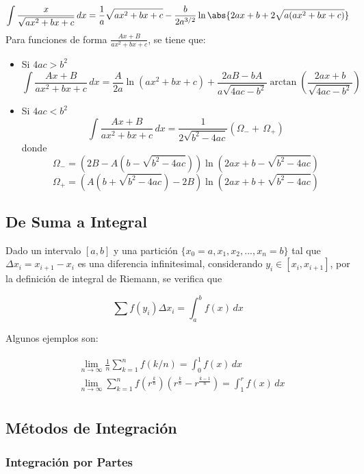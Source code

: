 \[\int\frac{x}{\sqrt{ax^2 + bx +c}}\,dx = \frac{1}{a}\sqrt{ax^2 +bx +c} - \frac{b}{2a^{3/2}}\ln{\abs{2ax +b+2\sqrt{a(ax^2+bx+c)}}}\]
\bigbreak
Para funciones de forma $\frac{Ax+B}{ax^2+bx+c}$, se tiene que:

\begin{itemize}
    \item Si $4ac>b^2$
    \[\int\frac{Ax+B}{ax^2+bx+c}\,dx = \frac{A}{2a}\ln{(ax^2+bx+c)}+\frac{2aB-bA}{a\sqrt{4ac-b^2}}\arctan{\left(\frac{2ax+b}{\sqrt{4ac-b^2}}\right)}\]
    \item Si $4ac<b^2$ %
    \[\int\frac{Ax+B}{ax^2+bx+c}\,dx = \frac{1}{2\sqrt{b^2-4ac}}
    \left(\Omega_{-}+\,\Omega_{+}\right)\]
    donde
    \[\Omega_{-} = (2B-A(b-\sqrt{b^2-4ac}))\ln{(2ax+b-\sqrt{b^2-4ac})}\]
    \[\Omega_{+} = (A(b+\sqrt{b^2-4ac})-2B)\ln{(2ax+b+\sqrt{b^2-4ac})}\]
\end{itemize}

\subsection{De Suma a Integral}

Dado un intervalo $[a, b]$ y una partición $\{x_0=a, x_1, x_2, ..., x_n=b\}$ tal que $\Delta x_i = x_{i+1}-x_i$ es una diferencia infinitesimal, considerando $y_i\in [x_i, x_{i+1}]$, por la definición de integral de Riemann, se verifica que

\[\sum f(y_i)\Delta x_i = \int^b_af(x)\,dx\]

Algunos ejemplos son:

\begin{equation}
\begin{split}
    &\lim_{n\to\infty}\frac{1}{n}\sum^n_{k=1}f(k/n)=\int^1_0f(x)\,dx\\
    &\lim_{n\to\infty}\sum^n_{k=1}f(r^{\frac{k}{n}})
    (r^{\frac{k}{n}}-r^{\frac{k-1}{n}})=\int^r_1f(x)\,dx\\
\end{split}
\nonumber
\end{equation}

\subsection{Métodos de Integración}

\subsubsection{Integración por Partes}

